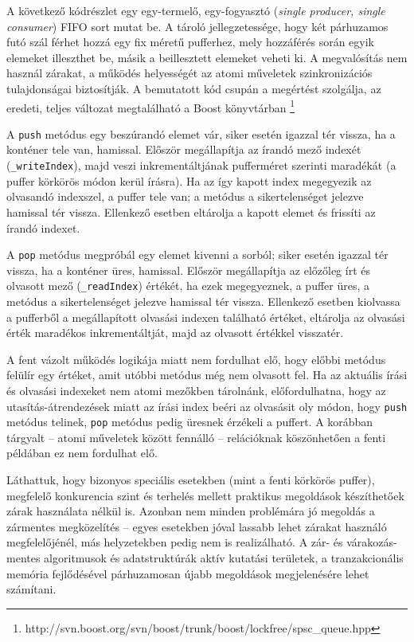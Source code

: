     A következő kódrészlet egy egy-termelő, egy-fogyasztó (\emph{single producer, single consumer}) FIFO sort mutat be. A tároló jellegzetessége, hogy két párhuzamos futó szál férhet hozzá egy fix méretű pufferhez, mely hozzáférés során egyik elemeket illeszthet be, másik a beillesztett elemeket veheti ki. A megvalósítás nem használ zárakat, a működés helyességét az atomi műveletek szinkronizációs tulajdonságai biztosítják. A bemutatott kód csupán a megértést szolgálja, az eredeti, teljes változat megtalálható a Boost könyvtárban \footnote{http://svn.boost.org/svn/boost/trunk/boost/lockfree/spsc\_queue.hpp}
    
%    
    A \texttt{push} metódus egy beszúrandó elemet vár, siker esetén igazzal tér vissza, ha a konténer tele van, hamissal. Először megállapítja az írandó mező indexét (\texttt{\_writeIndex}), majd veszi inkrementáltjának pufferméret szerinti maradékát (a puffer körkörös módon kerül írásra). Ha az így kapott index megegyezik az olvasandó indexszel, a puffer tele van; a metódus a sikertelenséget jelezve hamissal tér vissza. Ellenkező esetben eltárolja a kapott elemet és frissíti az írandó indexet. 
    
    A \texttt{pop} metódus megpróbál egy elemet kivenni a sorból; siker esetén igazzal tér vissza, ha a konténer üres, hamissal. Először megállapítja az előzőleg írt és olvasott mező (\texttt{\_readIndex}) értékét, ha ezek megegyeznek, a puffer üres, a metódus a sikertelenséget jelezve hamissal tér vissza. Ellenkező esetben kiolvassa a pufferből a megállapított olvasási indexen található értéket, eltárolja az olvasási érték maradékos inkrementáltját, majd az olvasott értékkel visszatér.
    
    A fent vázolt működés logikája miatt nem fordulhat elő, hogy előbbi metódus felülír egy értéket, amit utóbbi metódus még nem olvasott fel. Ha az aktuális írási és olvasási indexeket nem atomi mezőkben tárolnánk, előfordulhatna, hogy az utasítás-átrendezések miatt az írási index beéri az olvasásit oly módon, hogy \texttt{push} metódus telinek, \texttt{pop} metódus pedig üresnek érzékeli a puffert. A korábban tárgyalt -- atomi műveletek között fennálló -- relációknak köszönhetően a fenti példában ez nem fordulhat elő.
    
    Láthattuk, hogy bizonyos speciális esetekben (mint a fenti körkörös puffer), megfelelő konkurencia szint és terhelés mellett praktikus megoldások készíthetőek zárak használata nélkül is. Azonban nem minden problémára jó megoldás a zármentes megközelítés -- egyes esetekben jóval lassabb lehet zárakat használó megfelelőjénél, más helyzetekben pedig nem is realizálható. A zár- és várakozás-mentes algoritmusok és adatstruktúrák aktív kutatási területek, a tranzakcionális memória fejlődésével párhuzamosan újabb megoldások megjelenésére lehet számítani.
    
